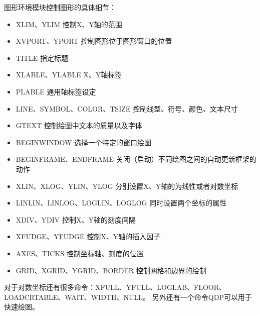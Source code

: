 图形环境模块控制图形的具体细节：
\begin{itemize}
\renewcommand\labelitemi{\dag}	%
\item XLIM、YLIM 控制X、Y轴的范围
\item XVPORT、YPORT 控制图形位于图形窗口的位置
\item TITLE 指定标题
\item XLABLE、YLABLE X、Y轴标签
\item PLABLE 通用轴标签设定
\item LINE、SYMBOL、COLOR、TSIZE 控制线型、符号、颜色、文本尺寸
\item GTEXT 控制绘图中文本的质量以及字体
\item BEGINWINDOW 选择一个特定的窗口绘图
\item BEGINFRAME、ENDFRAME 关闭（启动）不同绘图之间的自动更新框架的动作
\item XLIN、XLOG、YLIN、YLOG 分别设置X、Y轴的为线性或者对数坐标
\item LINLIN、LINLOG、LOGLIN、LOGLOG 同时设置两个坐标的属性
\item XDIV、YDIV 控制X、Y轴的刻度间隔
\item XFUDGE、YFUDGE 控制X、Y轴的插入因子
\item AXES、TICKS 控制坐标轴、刻度的位置
\item GRID、XGRID、YGRID、BORDER 控制网格和边界的绘制
\end{itemize}
对于对数坐标还有很多命令：XFULL、YFULL、LOGLAB、FLOOR、LOADCRTABLE、WAIT、WIDTH、NULL。
另外还有一个命令QDP可以用于快速绘图。
